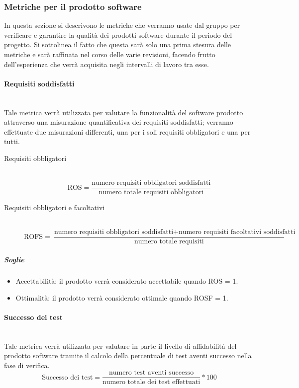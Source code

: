 \subsubsection{Metriche per il prodotto software}
\label{AppB:metricheSoft}
In questa sezione si descrivono le metriche che verranno usate dal gruppo per verificare e garantire la qualità dei prodotti software durante il periodo del progetto. Si sottolinea il fatto che questa sarà solo una prima stesura delle metriche e sarà raffinata nel corso delle varie revisioni, facendo frutto dell'esperienza che verrà acquisita negli intervalli di lavoro tra esse.

\paragraph{Requisiti soddisfatti}
\label{AppB:Funzionalita}
	~\\Tale metrica verrà utilizzata per valutare la funzionalità del software prodotto attraverso una misurazione quantificativa dei requisiti soddisfatti; verranno effettuate due misurazioni differenti, una per i soli requisiti obbligatori e una per tutti.

\begin{description}
\item[Requisiti obbligatori]
	~\\ \begin{displaymath}
		\mbox{ROS}=\frac{\mbox{numero requisiti obbligatori soddisfatti}}{\mbox{numero totale requisiti obbligatori}}
	\end{displaymath}
	
\item[Requisiti obbligatori e facoltativi]
	~\\ \begin{displaymath}
		\mbox{ROFS}=\frac{\mbox{numero requisiti obbligatori soddisfatti} + \mbox{numero requisiti facoltativi soddisfatti}}{\mbox{numero totale requisiti}}
	\end{displaymath}
\end{description}

\subparagraph{Soglie}
\begin{itemize}
\item Accettabilità: il prodotto verrà considerato accettabile quando ROS = 1.
\item Ottimalità: il prodotto verrà considerato ottimale quando ROSF = 1.
\end{itemize}

\paragraph{Successo dei test}
\label{AppB:Affidabilita}
	~\\Tale metrica verrà utilizzata per valutare in parte il livello di affidabilità del prodotto software tramite il calcolo della percentuale di test aventi successo nella fase di verifica.
	\begin{displaymath}
		\mbox{Successo dei test}=\frac{\mbox{numero test aventi successo}}{\mbox{numero totale dei test effettuati}} * 100
	\end{displaymath}
	
